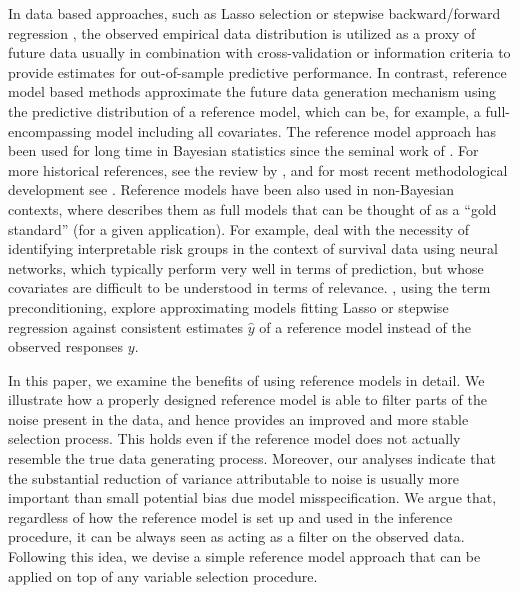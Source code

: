 \documentclass[american,]{article}
\theoremstyle{definition}
\begin{document}
In data based approaches, such as Lasso selection
\citep{tibshirani1996regression} or stepwise backward/forward 
regression \citep{venables2013modern,harrell2015regression}, the observed empirical data distribution is utilized as a
proxy of future data usually in combination with cross-validation
or information criteria to provide estimates for out-of-sample
predictive performance.
In contrast, reference model based methods approximate the future data generation
mechanism using the predictive distribution of a reference model,
which can be, for example, a full-encompassing model including all
covariates. The reference
model approach has been used for long time in Bayesian statistics
since the seminal work of \citet{paper:reference_lindley}. For more
historical references, see the review by \citet{vehtari2012survey}, and for
most recent methodological development see 
\citet{paper:projpred}.
Reference models have been also used in non-Bayesian contexts,
where \cite{harrell2015regression} describes them as full models that
can be thought of as a ``gold standard'' (for a given application).
For example,
\cite{faraggi2001understanding} deal with the necessity of identifying
interpretable risk groups in the context of survival data using neural
networks, which typically perform very well in terms of prediction,
but whose covariates are difficult to be understood in terms of
relevance. 
\cite{paul2008preconditioning}, using the term preconditioning,
explore approximating models fitting Lasso or stepwise regression
against consistent estimates $\hat{y}$ of a reference model instead of
the observed responses $y$.

In this paper, we examine the benefits of using reference
models in detail. We illustrate how a properly designed reference model is able 
to filter parts of the noise present in the data, and hence provides an improved and more
stable selection process. This holds even if the reference model does not actually resemble the
true data generating process. Moreover, our analyses indicate that the substantial reduction of
variance attributable to noise is usually
more important than small potential bias due model misspecification.
We argue that, regardless of how the reference model is set up and used in the
inference procedure, it can be always seen as acting as a filter on the observed 
data. Following this idea, we devise a simple reference model approach that can
be applied on top of any variable selection procedure. 
\end{document}
